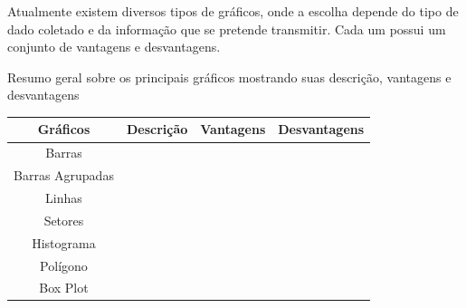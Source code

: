 \inic Atualmente existem diversos tipos de gráficos, onde a escolha depende do tipo de dado coletado e da informação que se pretende transmitir. Cada um possui um conjunto de vantagens e desvantagens.      

\begin{quadro}[h!tp]
    \centering
    \caption{Resumo geral sobre os principais gráficos mostrando suas descrição, vantagens e desvantagens}
    \begin{tabular}{|c|c|c|c|}
   \hline\hline
    Gráficos       & Descrição &  Vantagens & Desvantagens \\   
\hline\hline
  Barras           &           &           &             \\
  Barras Agrupadas &           &           &              \\
  Linhas           &           &           &              \\  
  Setores          &           &           &              \\
  Histograma       &           &           &              \\
  Polígono         &           &           &              \\
  Box Plot         &           &           &              \\
\hline\hline
\end{tabular}
\end{quadro}









